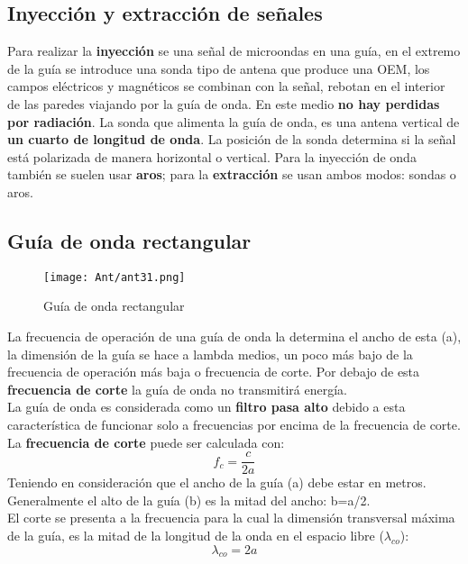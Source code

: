 \documentclass[
	12pt, %
	fleqn, %
	a4paper, %
	oneside, %
]{LegrandOrangeBook}
\begin{document}
\subsection{Inyección y extracción de señales}
Para realizar la \textbf{inyección} se una señal de microondas en una guía, en el extremo de la guía se introduce una sonda tipo de antena que produce una OEM, los campos eléctricos y magnéticos se combinan con la señal, rebotan en el interior de las paredes viajando por la guía de onda. En este medio \textbf{no hay perdidas por radiación}. La sonda que alimenta la guía de onda, es una antena vertical de \textbf{un cuarto de longitud de onda}. La posición de la sonda determina si la señal está polarizada de manera horizontal o vertical. Para la inyección de onda también se suelen usar \textbf{aros}; para la \textbf{extracción} se usan ambos modos: sondas o aros.
\subsection{Guía de onda rectangular}
\begin{figure}[H]
\centering
\texttt{[image: Ant/ant31.png]}
\caption{Guía de onda rectangular}
\end{figure}
La frecuencia de operación de una guía de onda la determina el ancho de esta (a), la dimensión de la guía se hace a lambda medios, un poco más bajo de la frecuencia de operación más baja o frecuencia de corte. Por debajo de esta \textbf{frecuencia de corte} la guía de onda no transmitirá energía.\\
La guía de onda es considerada como un \textbf{filtro pasa alto} debido a esta característica de funcionar solo a frecuencias por encima de la frecuencia de corte. La \textbf{frecuencia de corte} puede ser calculada con:
\begin{equation}
f_{c}=\frac{c}{2a}
\end{equation}
Teniendo en consideración que el ancho de la guía (a) debe estar en metros.\\
Generalmente el alto de la guía (b) es la mitad del ancho: b=a/2.\\
El corte se presenta a la frecuencia para la cual la dimensión transversal máxima de la guía, es la mitad de la longitud de la onda en el espacio libre ($\lambda_{co}$):
\begin{equation}
\lambda_{co}=2a
\end{equation}
\end{document}
